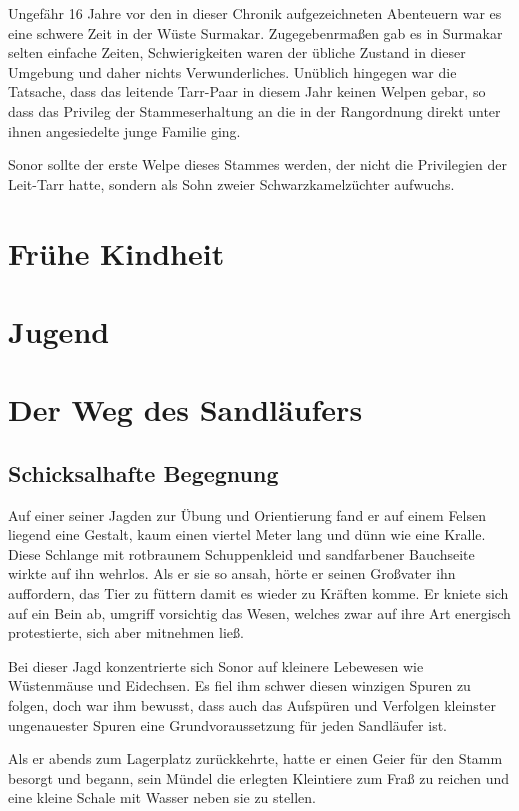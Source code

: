 	Ungefähr 16 Jahre vor den in dieser Chronik aufgezeichneten Abenteuern war es eine schwere Zeit in der Wüste Surmakar. Zugegebenrmaßen gab es in Surmakar selten einfache Zeiten, Schwierigkeiten waren der übliche Zustand in dieser Umgebung und daher nichts Verwunderliches. 
	Unüblich hingegen war die Tatsache, dass das leitende Tarr-Paar in diesem Jahr keinen Welpen gebar, so dass das Privileg der Stammeserhaltung an die in der Rangordnung direkt unter ihnen angesiedelte junge Familie ging.
	
	Sonor sollte der erste Welpe dieses Stammes werden, der nicht die Privilegien der Leit-Tarr hatte, sondern als Sohn zweier Schwarzkamelzüchter aufwuchs.

	
	\section{Frühe Kindheit}
	
	\section{Jugend}
	
	\section{Der Weg des Sandläufers}
	\subsection{Schicksalhafte Begegnung}
	Auf einer seiner Jagden zur Übung und Orientierung fand er auf einem Felsen liegend eine Gestalt, kaum einen viertel Meter lang und dünn wie eine Kralle. Diese Schlange mit rotbraunem Schuppenkleid und sandfarbener Bauchseite wirkte auf ihn wehrlos.
	Als er sie so ansah, hörte er seinen Großvater ihn auffordern, das Tier zu füttern damit es wieder zu Kräften komme.
	Er kniete sich auf ein Bein ab, umgriff vorsichtig das Wesen, welches zwar auf ihre Art energisch protestierte, sich aber mitnehmen ließ.
	
	Bei dieser Jagd konzentrierte sich Sonor auf kleinere Lebewesen wie Wüstenmäuse und Eidechsen. Es fiel ihm schwer diesen winzigen Spuren zu folgen, doch war ihm bewusst, dass auch das Aufspüren und Verfolgen kleinster ungenauester Spuren eine Grundvoraussetzung für jeden Sandläufer ist.
	
	Als er abends zum Lagerplatz zurückkehrte, hatte er einen Geier für den Stamm besorgt und begann, sein Mündel die erlegten Kleintiere zum Fraß zu reichen und eine kleine Schale mit Wasser neben sie zu stellen. 
	
